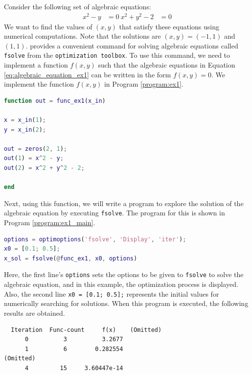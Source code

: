 \documentclass[graybox, envcountchap]{svmult}
\begin{document}
\begin{example}\label{ex:algenraic_equation_ex1}
Consider the following set of algebraic equations:
\begin{subequations}\label{eq:algebraic_equation_ex1}
\begin{align}
x^2 - y &= 0\
x^2 + y^2 - 2 &= 0
\end{align}
\end{subequations}
We want to find the values of $(x, y)$ that satisfy these equations using
numerical computations. Note that the solutions are $(x, y) = (-1, 1)$ and $(1,
1)$. \matlab provides a convenient command for solving algebraic equations
called \verb|fsolve| from the \verb|optimization toolbox|. To use this command,
we need to implement a function $f(x, y)$ such that the algebraic equations in
Equation \ref{eq:algebraic_equation_ex1} can be written in the form $f(x, y) =
0$.  We implement the function $f(x, y)$ in Program \ref{program:ex1}.

\begin{lstlisting}[language=Matlab, caption=func\_ex1.m, label={program:ex1}]
function out = func_ex1(x_in)

x = x_in(1);
y = x_in(2);

out = zeros(2, 1);
out(1) = x^2 - y;
out(2) = x^2 + y^2 - 2;

end
\end{lstlisting}

Next, using this function, we will write a program to explore the solution of
the algebraic equation by executing \verb|fsolve|. The program for this is
shown in Program \ref{program:ex1_main}.

\begin{lstlisting}[language=Matlab, caption=main\_ex1.m, label={program:ex1_main}]
options = optimoptions('fsolve', 'Display', 'iter');
x0 = [0.1; 0.5];
x_sol = fsolve(@func_ex1, x0, options)
\end{lstlisting}

Here, the first line's \verb|options| sets the options to be given to
\verb|fsolve| to solve the algebraic equation, and in this example, the
optimization process is displayed. Also, the second line \verb|x0 = [0.1; 0.5];|
represents the initial values for numerically searching for solutions.  When
this program is executed, the following results are obtained.

\smallskip
\begin{execution}
\begin{verbatim}
  Iteration  Func-count     f(x)    (Omitted) 
      0          3          3.2677
      1          6        0.282554
(Omitted)
      4         15     3.60447e-14


\end{verbatim}
\end{execution}
\end{example}
\end{document}
